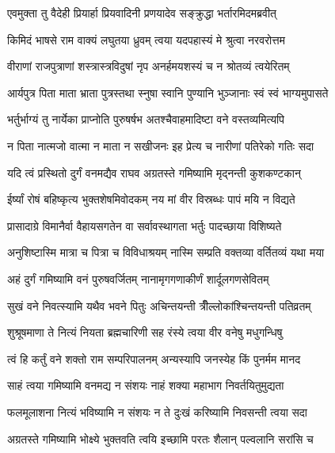 
\twolineshloka
{एवमुक्ता तु वैदेही प्रियार्हा प्रियवादिनी}
{प्रणयादेव सङ्क्रुद्धा भर्तारमिदमब्रवीत्} %

\twolineshloka
{किमिदं भाषसे राम वाक्यं लघुतया ध्रुवम्}
{त्वया यदपहास्यं मे श्रुत्वा नरवरोत्तम} %

\twolineshloka
{वीराणां राजपुत्राणां शस्त्रास्त्रविदुषां नृप}
{अनर्हमयशस्यं च न श्रोतव्यं त्वयेरितम्} %

\twolineshloka
{आर्यपुत्र पिता माता भ्राता पुत्रस्तथा स्नुषा}
{स्वानि पुण्यानि भुञ्जानाः स्वं स्वं भाग्यमुपासते} %

\twolineshloka
{भर्तुर्भाग्यं तु नार्येका प्राप्नोति पुरुषर्षभ}
{अतश्चैवाहमादिष्टा वने वस्तव्यमित्यपि} %

\twolineshloka
{न पिता नात्मजो वात्मा न माता न सखीजनः}
{इह प्रेत्य च नारीणां पतिरेको गतिः सदा} %

\twolineshloka
{यदि त्वं प्रस्थितो दुर्गं वनमद्यैव राघव}
{अग्रतस्ते गमिष्यामि मृद्नन्ती कुशकण्टकान्} %

\twolineshloka
{ईर्ष्यां रोषं बहिष्कृत्य भुक्तशेषमिवोदकम्}
{नय मां वीर विस्रब्धः पापं मयि न विद्यते} %

\twolineshloka
{प्रासादाग्रे विमानैर्वा वैहायसगतेन वा}
{सर्वावस्थागता भर्तुः पादच्छाया विशिष्यते} %

\twolineshloka
{अनुशिष्टास्मि मात्रा च पित्रा च विविधाश्रयम्}
{नास्मि सम्प्रति वक्तव्या वर्तितव्यं यथा मया} %

\twolineshloka
{अहं दुर्गं गमिष्यामि वनं पुरुषवर्जितम्}
{नानामृगगणाकीर्णं शार्दूलगणसेवितम्} %

\twolineshloka
{सुखं वने निवत्स्यामि यथैव भवने पितुः}
{अचिन्तयन्ती त्रीँल्लोकांश्चिन्तयन्ती पतिव्रतम्} %

\twolineshloka
{शुश्रूषमाणा ते नित्यं नियता ब्रह्मचारिणी}
{सह रंस्ये त्वया वीर वनेषु मधुगन्धिषु} %

\twolineshloka
{त्वं हि कर्तुं वने शक्तो राम सम्परिपालनम्}
{अन्यस्यापि जनस्येह किं पुनर्मम मानद} %

\twolineshloka
{साहं त्वया गमिष्यामि वनमद्य न संशयः}
{नाहं शक्या महाभाग निवर्तयितुमुद्यता} %

\twolineshloka
{फलमूलाशना नित्यं भविष्यामि न संशयः}
{न ते दुःखं करिष्यामि निवसन्ती त्वया सदा} %

\twolineshloka
{अग्रतस्ते गमिष्यामि भोक्ष्ये भुक्तवति त्वयि}
{इच्छामि परतः शैलान् पल्वलानि सरांसि च} %

